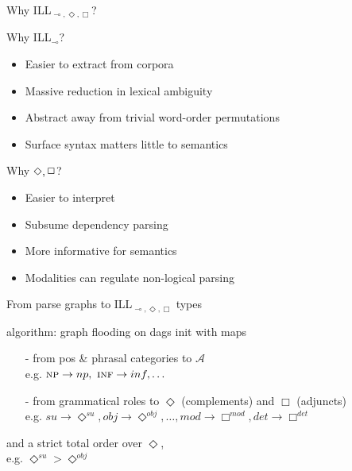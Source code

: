 \documentclass{beamer}
\newcommand{\li}{\!\multimap\!}
\begin{document}
\begin{frame}{Why ILL$_{\li, \Diamond, \Box}$?}
\small
\begin{block}{Why ILL$_{\li}$?}
	\begin{itemize}
	\item Easier to extract from corpora
	\item Massive reduction in lexical ambiguity 
	\item Abstract away from trivial word-order permutations
	\item Surface syntax matters little to semantics
	\end{itemize}
\end{block}
\begin{block}{Why $\Diamond, \raisebox{1.5pt}{\ensuremath{\Box}}$?}
	\begin{itemize}
	\item Easier to interpret
	\item Subsume dependency parsing
	\item More informative for semantics 
	\item Modalities can regulate non-logical parsing
	\end{itemize}
\end{block}

\end{frame}

\begin{frame}{From parse graphs to ILL$_{\li, \Diamond, \Box}$ types}
	\small
	\begin{block}{algorithm: graph flooding on dags}
		init with maps
		\begin{itemize}
			\item[-] from pos \& phrasal categories to $\mathcal{A}$	\\
			\quad e.g. $\textsc{np} \to np,\ \textsc{inf} \to inf, \dots$
			\item[-] from grammatical roles to $\Diamond$ (complements) and $\Box$ (adjuncts)\\
			\quad e.g. $su \to \Diamond^{su}, obj \to \Diamond^{obj}, \dots, mod \to \Box^{mod}, det \to \Box^{det}$
		\end{itemize}
		and a strict total order over $\Diamond$, \\
		e.g. $\Diamond^{su} > \Diamond^{obj}$
	\end{block}
\end{frame}
\end{document}
